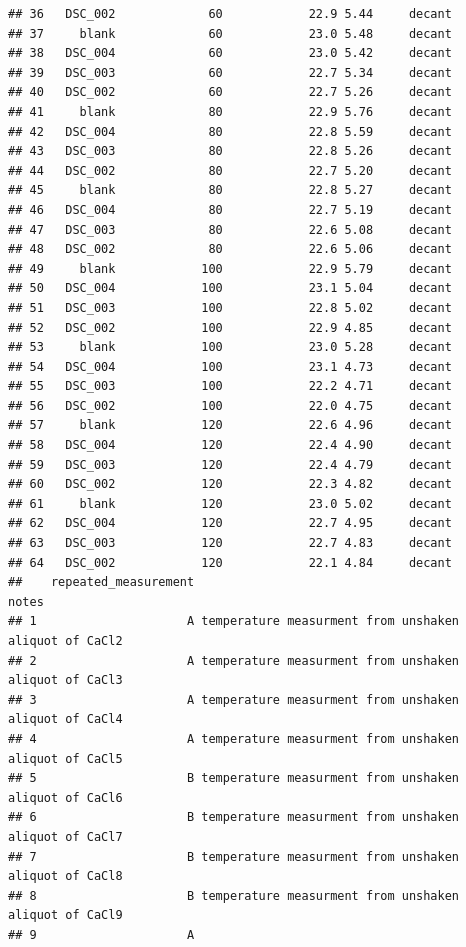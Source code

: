 \documentclass[
]{article}
\begin{document}
\begin{verbatim}
## 36   DSC_002             60            22.9 5.44     decant
## 37     blank             60            23.0 5.48     decant
## 38   DSC_004             60            23.0 5.42     decant
## 39   DSC_003             60            22.7 5.34     decant
## 40   DSC_002             60            22.7 5.26     decant
## 41     blank             80            22.9 5.76     decant
## 42   DSC_004             80            22.8 5.59     decant
## 43   DSC_003             80            22.8 5.26     decant
## 44   DSC_002             80            22.7 5.20     decant
## 45     blank             80            22.8 5.27     decant
## 46   DSC_004             80            22.7 5.19     decant
## 47   DSC_003             80            22.6 5.08     decant
## 48   DSC_002             80            22.6 5.06     decant
## 49     blank            100            22.9 5.79     decant
## 50   DSC_004            100            23.1 5.04     decant
## 51   DSC_003            100            22.8 5.02     decant
## 52   DSC_002            100            22.9 4.85     decant
## 53     blank            100            23.0 5.28     decant
## 54   DSC_004            100            23.1 4.73     decant
## 55   DSC_003            100            22.2 4.71     decant
## 56   DSC_002            100            22.0 4.75     decant
## 57     blank            120            22.6 4.96     decant
## 58   DSC_004            120            22.4 4.90     decant
## 59   DSC_003            120            22.4 4.79     decant
## 60   DSC_002            120            22.3 4.82     decant
## 61     blank            120            23.0 5.02     decant
## 62   DSC_004            120            22.7 4.95     decant
## 63   DSC_003            120            22.7 4.83     decant
## 64   DSC_002            120            22.1 4.84     decant
##    repeated_measurement                                                 notes
## 1                     A temperature measurment from unshaken aliquot of CaCl2
## 2                     A temperature measurment from unshaken aliquot of CaCl3
## 3                     A temperature measurment from unshaken aliquot of CaCl4
## 4                     A temperature measurment from unshaken aliquot of CaCl5
## 5                     B temperature measurment from unshaken aliquot of CaCl6
## 6                     B temperature measurment from unshaken aliquot of CaCl7
## 7                     B temperature measurment from unshaken aliquot of CaCl8
## 8                     B temperature measurment from unshaken aliquot of CaCl9
## 9                     A                                                      

\end{verbatim}
\end{document}
